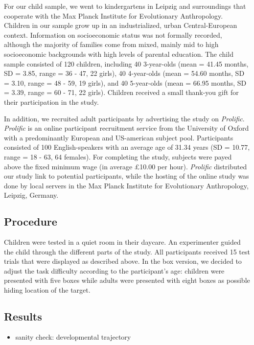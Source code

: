 \documentclass[
  man,floatsintext]{apa6}
\providecommand{\tightlist}{%
  \setlength{\itemsep}{0pt}\setlength{\parskip}{0pt}}
\begin{document}
For our child sample, we went to kindergartens in Leipzig and surroundings that cooperate with the Max Planck Institute for Evolutionary Anthropology. Children in our sample grow up in an industrialized, urban Central-European context. Information on socioeconomic status was not formally recorded, although the majority of families come from mixed, mainly mid to high socioeconomic backgrounds with high levels of parental education.
The child sample consisted of
120 children, including
40 3-year-olds
(mean = 41.45 months,
SD = 3.85,
range = 36
- 47,
22 girls),
40 4-year-olds
(mean = 54.60 months,
SD = 3.10,
range = 48
- 59,
19 girls),
and 40 5-year-olds
(mean = 66.95 months,
SD = 3.39,
range = 60
- 71,
22 girls).
Children received a small thank-you gift for their participation in the study.

In addition, we recruited adult participants by advertising the study on \emph{Prolific}. \emph{Prolific} is an online participant recruitment service from the University of Oxford with a predominantly European and US-american subject pool. Participants consisted of 100 English-speakers with an average age of 31.34 years (SD = 10.77, range = 18 - 63, 64 females).
For completing the study, subjects were payed above the fixed minimum wage (in average £10.00 per hour). \emph{Prolific} distributed our study link to potential participants, while the hosting of the online study was done by local servers in the Max Planck Institute for Evolutionary Anthropology, Leipzig, Germany.

\hypertarget{procedure-1}{%
\subsection{Procedure}\label{procedure-1}}

Children were tested in a quiet room in their daycare. An experimenter guided the child through the different parts of the study.
All participants received 15 test trials that were displayed as described above. In the box version, we decided to adjust the task difficulty according to the participant's age: children were presented with five boxes while adults were presented with eight boxes as possible hiding location of the target.

\hypertarget{results-3}{%
\subsection{Results}\label{results-3}}

\begin{itemize}
\tightlist
\item
  sanity check: developmental trajectory
\end{itemize}
\end{document}
